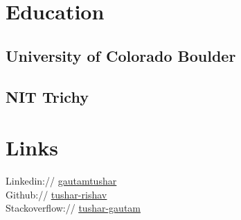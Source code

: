 \documentclass[]{deedy-resume-openfont}
\begin{document}
%
%
\lastupdated

%
%
%
%

\begin{minipage}[t]{0.33\textwidth} 

\sectionsep
\section{Education} 

\subsection{University of Colorado Boulder}
\sectionsep

\subsection{NIT Trichy}
\sectionsep


\section{Links} 
\textbullet{} Linkedin:// \href{https://www.linkedin.com/in/gautamtushar}{\underline {gautamtushar}} \\
\textbullet{} Github:// \href{https://github.com/tushar-rishav}{\underline {tushar-rishav}} \\
\textbullet{} Stackoverflow:// \href{https://stackoverflow.com/users/3673031/tushar-gautam}{\underline {tushar-gautam}}
\sectionsep



\end{minipage}
\end{document}
